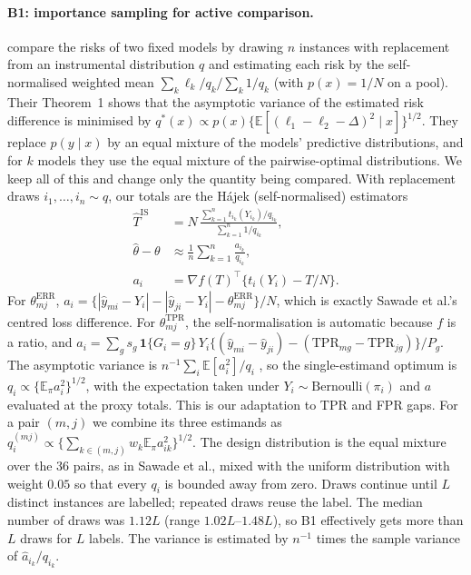 \documentclass[pdflatex,sn-mathphys-num,iicol]{sn-jnl}
\theoremstyle{thmstyleone}
\theoremstyle{thmstyletwo}
\theoremstyle{thmstylethree}
\begin{document}
\paragraph{B1: importance sampling for active comparison.} \citet{sawade2012active} compare the risks of two fixed models by drawing $n$ instances with replacement from an instrumental distribution $q$ and estimating each risk by the self-normalised weighted mean $\sum_k \ell_k/q_k\big/\sum_k 1/q_k$ (with $p(x)=1/N$ on a pool). Their Theorem~1 shows that the asymptotic variance of the estimated risk difference is minimised by $q^*(x)\propto p(x)\{\mathbb E[(\ell_1-\ell_2-\Delta)^2\mid x]\}^{1/2}$. They replace $p(y\mid x)$ by an equal mixture of the models' predictive distributions, and for $k$ models they use the equal mixture of the pairwise-optimal distributions. We keep all of this and change only the quantity being compared. With replacement draws $i_1,\dots,i_n\sim q$, our totals are the Hájek (self-normalised) estimators
\begin{align*}
\hat T^{\mathrm{IS}}&=N\,\frac{\sum_{k=1}^n t_{i_k}(Y_{i_k})/q_{i_k}}{\sum_{k=1}^n 1/q_{i_k}},\\
\hat\theta-\theta&\approx\frac1n\sum_{k=1}^n \frac{a_{i_k}}{q_{i_k}},\\
a_i&=\nabla f(T)^{\top}\{t_i(Y_i)-T/N\}.
\end{align*}
For $\theta^{\mathrm{ERR}}_{mj}$, $a_i=\{|\hat y_{mi}-Y_i|-|\hat y_{ji}-Y_i|-\theta^{\mathrm{ERR}}_{mj}\}/N$, which is exactly Sawade et al.'s centred loss difference. For $\theta^{\mathrm{TPR}}_{mj}$, the self-normalisation is automatic because $f$ is a ratio, and $a_i=\sum_g s_g\,\mathbf 1\{G_i=g\}\,Y_i\{(\hat y_{mi}-\hat y_{ji})-(\mathrm{TPR}_{mg}-\mathrm{TPR}_{jg})\}/P_g$. The asymptotic variance is $n^{-1}\sum_i\mathbb E[a_i^2]/q_i$ \citep{hansen1943}, so the single-estimand optimum is $q_i\propto\{\mathbb E_\pi a_i^2\}^{1/2}$, with the expectation taken under $Y_i\sim\mathrm{Bernoulli}(\pi_i)$ and $a$ evaluated at the proxy totals. This is our adaptation to TPR and FPR gaps. For a pair $(m,j)$ we combine its three estimands as $q^{(mj)}_i\propto\{\sum_{k\in(m,j)}w_k\mathbb E_\pi a_{ik}^2\}^{1/2}$. The design distribution is the equal mixture over the 36 pairs, as in Sawade et al., mixed with the uniform distribution with weight $0.05$ so that every $q_i$ is bounded away from zero. Draws continue until $L$ distinct instances are labelled; repeated draws reuse the label. The median number of draws was $1.12L$ (range $1.02L$--$1.48L$), so B1 effectively gets more than $L$ draws for $L$ labels. The variance is estimated by $n^{-1}$ times the sample variance of $\hat a_{i_k}/q_{i_k}$.
\end{document}
